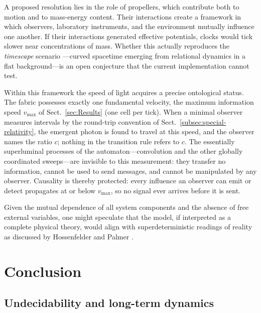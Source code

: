 \documentclass{ijuc}
\begin{document}
A proposed resolution lies in the role of propellers, which contribute both to motion and to mass-energy content. 
Their interactions create a framework in which observers, laboratory instruments, and the environment mutually influence one another. 
If their interactions generated effective potentials, clocks would tick slower near concentrations of mass. 
Whether this actually reproduces the \textit{timescape} scenario \cite{duley2013timescape}—curved spacetime emerging from relational dynamics in a flat background—is an open conjecture that the current implementation cannot test.


Within this framework the speed of light acquires a precise ontological status. The fabric possesses exactly one fundamental velocity, the maximum information speed $v_{\max}$ of Sect.~\ref{sec:Results} (one cell per tick). When a minimal observer measures intervals by the round-trip convention of Sect.~\ref{subsec:special-relativity}, the emergent photon is found to travel at this speed, and the observer names the ratio $c$; nothing in the transition rule refers to $c$. The essentially superluminal processes of the automaton---convolution and the other globally coordinated sweeps---are invisible to this measurement: they transfer no information, cannot be used to send messages, and cannot be manipulated by any observer. Causality is thereby protected: every influence an observer can emit or detect propagates at or below $v_{\max}$, so no signal ever arrives before it is sent.

Given the mutual dependence of all system components and the absence of free external variables, one might speculate that the model, if interpreted as a complete physical theory, would align with superdeterministic readings of reality as discussed by Hossenfelder and Palmer \cite{hossenfelder2020rethinking}.


\section{Conclusion\label{sec:Discussion}}

\subsection{Undecidability and long-term dynamics}\label{sec-undecidability}
\end{document}

